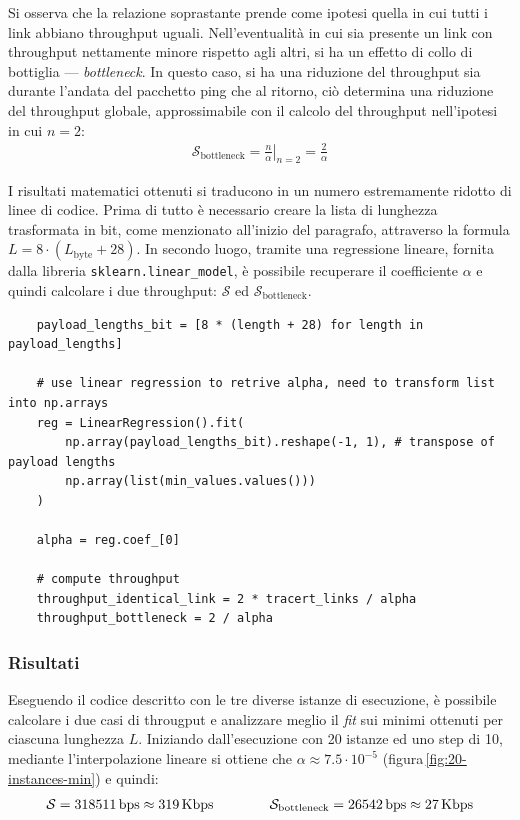 \noindent Si osserva che la relazione soprastante prende come ipotesi quella in cui tutti i link abbiano throughput uguali. Nell'eventualità in cui sia presente un link con throughput nettamente minore rispetto agli altri, si ha un effetto di collo di bottiglia — \textsl{bottleneck}. In questo caso, si ha una riduzione del throughput sia durante l'andata del pacchetto ping che al ritorno, ciò determina una riduzione del throughput globale, approssimabile con il calcolo del throughput nell'ipotesi in cui $n = 2$:
\begin{gather*}
    \mathcal{S}_{\text{bottleneck}} = \left.\frac{n}{\alpha}\right|_{n = 2} = \frac{2}{\alpha} 
\end{gather*}

\vspace{20px}

\noindent I risultati matematici ottenuti si traducono in un numero estremamente ridotto di linee di codice. Prima di tutto è necessario creare la lista di lunghezza trasformata in bit, come menzionato all'inizio del paragrafo, attraverso la formula $L = 8 \cdot (L_{\text{byte}} + 28)$. In secondo luogo, tramite una regressione lineare, fornita dalla libreria \texttt{sklearn.linear\_model}, è possibile recuperare il coefficiente $\alpha$ e quindi calcolare i due throughput: $\mathcal{S}$ ed $\mathcal{S}_{\text{bottleneck}}$.
\begin{lstlisting}
    payload_lengths_bit = [8 * (length + 28) for length in payload_lengths]

    # use linear regression to retrive alpha, need to transform list into np.arrays
    reg = LinearRegression().fit(
        np.array(payload_lengths_bit).reshape(-1, 1), # transpose of payload lengths
        np.array(list(min_values.values())) 
    )

    alpha = reg.coef_[0]

    # compute throughput
    throughput_identical_link = 2 * tracert_links / alpha
    throughput_bottleneck = 2 / alpha
\end{lstlisting}

\vspace{10px}\subsubsection*{Risultati}

Eseguendo il codice descritto con le tre diverse istanze di esecuzione, è possibile calcolare i due casi di througput e analizzare meglio il \textsl{fit} sui minimi ottenuti per ciascuna lunghezza $L$. Iniziando dall'esecuzione con 20 istanze ed uno step di 10, mediante l'interpolazione lineare si ottiene che $\alpha \approx 7.5 \cdot 10^{-5}$ (figura\,\ref{fig:20-instances-min}) e quindi:
\begin{gather*}
    \mathcal{S} = 318511\,\text{bps} \approx  319\,\text{Kbps}  \hspace{40px} \mathcal{S}_{\text{bottleneck}} = 26542\,\text{bps} \approx  27\,\text{Kbps}
\end{gather*}

